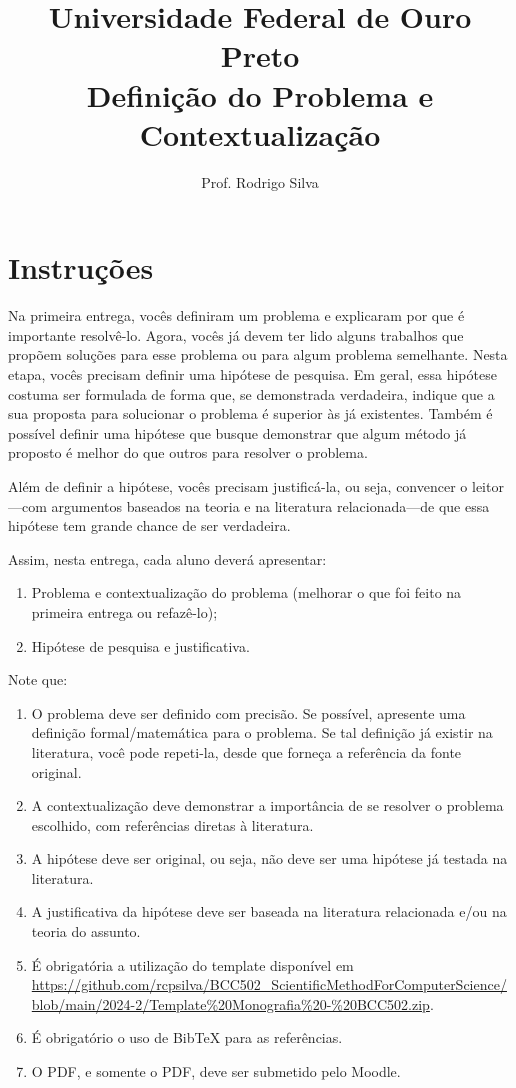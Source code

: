 \documentclass{article}
\title{\vspace{-2cm}Universidade Federal de Ouro Preto \\ Definição do Problema e Contextualização}
\author{Prof. Rodrigo Silva}
\date{}
\begin{document}
\maketitle

\section*{Instruções}

Na primeira entrega, vocês definiram um problema e explicaram por que é importante resolvê-lo. Agora, vocês já devem ter lido alguns trabalhos que propõem soluções para esse problema ou para algum problema semelhante. Nesta etapa, vocês precisam definir uma hipótese de pesquisa. Em geral, essa hipótese costuma ser formulada de forma que, se demonstrada verdadeira, indique que a sua proposta para solucionar o problema é superior às já existentes. Também é possível definir uma hipótese que busque demonstrar que algum método já proposto é melhor do que outros para resolver o problema.

Além de definir a hipótese, vocês precisam justificá-la, ou seja, convencer o leitor—com argumentos baseados na teoria e na literatura relacionada—de que essa hipótese tem grande chance de ser verdadeira.

Assim, nesta entrega, cada aluno deverá apresentar:
\begin{enumerate}
    \item Problema e contextualização do problema (melhorar o que foi feito na primeira entrega ou refazê-lo);
    \item Hipótese de pesquisa e justificativa.
\end{enumerate}

Note que:
\begin{enumerate}
    \item O problema deve ser definido com precisão. Se possível, apresente uma definição formal/matemática para o problema. Se tal definição já existir na literatura, você pode repeti-la, desde que forneça a referência da fonte original.
    \item A contextualização deve demonstrar a importância de se resolver o problema escolhido, com referências diretas à literatura.
    \item A hipótese deve ser original, ou seja, não deve ser uma hipótese já testada na literatura.
    \item A justificativa da hipótese deve ser baseada na literatura relacionada e/ou na teoria do assunto.
    \item É obrigatória a utilização do template disponível em \url{https://github.com/rcpsilva/BCC502_ScientificMethodForComputerScience/blob/main/2024-2/Template%20Monografia%20-%20BCC502.zip}.
    \item É obrigatório o uso de BibTeX para as referências.
    \item O PDF, e somente o PDF, deve ser submetido pelo Moodle.
\end{enumerate}

%
%
\end{document}
